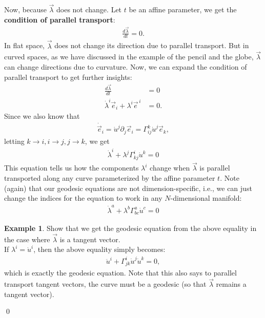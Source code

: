 \documentclass{book}
\theoremstyle{definition}
\newtheorem{exmp}{Example}[section]
\begin{document}
Now, because $\vec{\lambda}$ does not change. Let $t$ be an affine parameter, we get the \textbf{condition of parallel transport}:
\begin{align*}
\frac{d\vec{\lambda}}{dt} = 0.
\end{align*}  
In flat space, $\vec{\lambda}$ does not change its direction due to parallel transport. But in curved spaces, as we have discussed in the example of the pencil and the globe, $\vec{\lambda}$ can change directions due to curvature. Now, we can expand the condition of parallel transport to get further insights: 
\begin{align*}
\frac{d\vec{\lambda}}{dt} &= 0\\
\dot{\lambda}^i \vec{e}_i + \lambda^i\vec{e}^{\,i} &= 0.
\end{align*}
Since we also know that
\begin{align*}
\dot{\vec{e}}_i = \dot{u}^j\partial_j\vec{e}_i = \Gamma^k_{ij}\dot{u}^j\vec{e}_k,
\end{align*}
letting $k\rightarrow i, i \rightarrow j, j \rightarrow k$, we get
\begin{align*}
\dot{\lambda}^i + \lambda^j \Gamma^i_{kj}\dot{u}^k = 0
\end{align*}
This equation tells us how the components $\lambda^i$ change when $\vec{\lambda}$ is parallel transported along any curve parameterized by the affine parameter $t$. Note (again) that our geodesic equations are not dimension-specific, i.e., we can just change the indices for the equation to work in any $N$-dimensional manifold:
\begin{align*}
\boxed{\dot{\lambda}^a + \lambda^b \Gamma^a_{bc}\dot{u}^c = 0}
\end{align*}

\begin{exmp}
	Show that we get the geodesic equation from the above equality in the case where $\vec{\lambda}$ is a tangent vector.\\
	
	If $\lambda^i = \dot{u}^i$, then the above equality simply becomes:
	\begin{align*}
	\ddot{u}^i + \Gamma^i_{jk}\dot{u}^j\dot{u}^k = 0,
	\end{align*}
	which is exactly the geodesic equation. Note that this also says to parallel transport tangent vectors, the curve must be a geodesic (so that $\vec{\lambda}$ remains a tangent vector). 
\end{exmp}\qed
\end{document}
